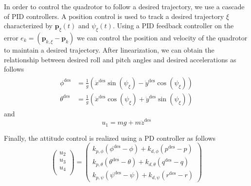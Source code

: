 \documentclass[letterpaper, 10 pt, conference]{ieeeconf}  %
\begin{document}
In order to control the quadrotor to follow a desired trajectory, we use a cascade of PID controllers.
A position control is used to track a desired trajectory $\xi$ characterized by ${\bm {p}}_\xi(t)$ and $\psi_\xi(t)$. Using a PID feedback controller on the error $e_k=(\bm {p}_{k,\xi}-\bm {p}_k)$ we can control the position and velocity of the quadrotor to maintain a desired trajectory.
After linearization, we can obtain the relationship between desired roll and pitch angles and desired accelerations as follows
\begin{gather}
\begin{align}
\phi^{\textrm{des}} &= \frac{1}{g}\left(\ddot{x}^{\textrm{des}}\sin(\psi_\xi) - \ddot{y}^{\textrm{des}}\cos(\psi_\xi)\right)\\
\theta^{\textrm{des}} &= \frac{1}{g}\left(\ddot{x}^{\textrm{des}}\cos(\psi_\xi) + \ddot{y}^{\textrm{des}}\sin(\psi_\xi)\right)
\end{align}
\end{gather}
and 
\begin{equation}
u_1 = mg + m\ddot{z}^{\textrm{des}} 
\end{equation}
 
Finally, the attitude control is realized using a PD controller as follows
\begin{equation}\label{eq:att}
\left(%
\begin{array}{c}
  u_2 \\
  u_3\\
  u_4\\
\end{array}%
\right) =\left(%
\begin{array}{c}
k_{p,\phi}(\phi^{\textrm{des}} - \phi) + k_{d,\phi}(p^{\textrm{des}} - p)\\
k_{p,\theta}(\theta^{\textrm{des}} - \theta) + k_{d,\theta}(q^{\textrm{des}} - q)\\
k_{p,\psi}(\psi^{\textrm{des}} - \psi) + k_{d,\psi}(r^{\textrm{des}} - r)
\end{array}%
\right)
\end{equation}
\end{document}
